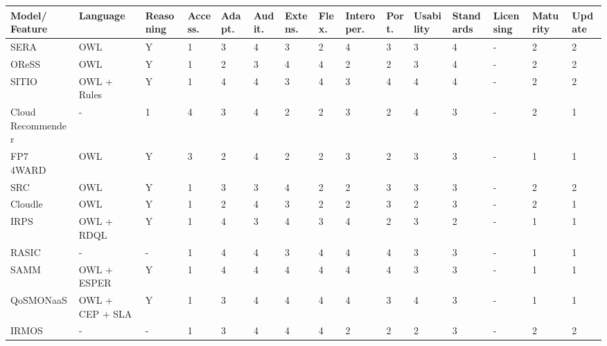 \begin{sidewaystable}[!ht]
\renewcommand{\arraystretch}{1.3}
\tiny
\begin{center}
\begin{tabular}[c]{|p{2.5cm}|p{1.2cm}|p{1.2cm}|p{1.2cm}|p{0.8cm}|p{0.8cm}|p{0.8cm}|p{0.8cm}|p{1.1cm}|p{1.1cm}|p{1.1cm}|p{1.1cm}|p{1.1cm}|p{1.1cm}|p{1.1cm}|} 
\hline
  \textbf{Model/ Feature} & \textbf{Language} & \textbf{Reasoning} & \textbf{Access.} & \textbf{Adapt.} & \textbf{Audit.} & \textbf{Extens.} & \textbf{Flex.} & \textbf{Interoper.} & \textbf{Port.} & \textbf{Usability} & \textbf{Standards} & \textbf{Licensing} & \textbf{Maturity} & \textbf{Update} \\ \hline
   SERA~\cite{Ejarque:2008:USR:1443230.1444322} & OWL & Y & 1 & 3 & 4 & 3 & 2 & 4 & 3 & 3 & 4 & - & 2 & 2 \\ \hline
   OReSS~\cite{2009gdc..conf..221Y} & OWL & Y & 1 & 2 & 3 & 4 & 4 & 2 & 2 & 3 & 4 & - & 2 & 2 \\ \hline
   SITIO~\cite{Garcia-Sanchez:2010:ASS:1852403.1852409} & OWL + Rules & Y & 1 & 4 & 4  & 3 & 4 & 3 & 4 & 4 & 4 & - & 2 & 2 \\ \hline
   Cloud Recommender~\cite{DBLP:conf/gecon/ZhangRNMH12} & - & 1 & 4 & 3 & 4 & 2 & 2 & 3 & 2 & 4 & 3 & - & 2 & 1 \\ \hline
   FP7 4WARD~\cite{5682131} & OWL & Y & 3 & 2 & 4 & 2 & 2 & 3 & 2& 3 & 3 & -& 1 & 1 \\ \hline
   SRC~\cite{DBLP:conf/soca/ChenL10} & OWL & Y & 1 & 3 & 3 & 4 & 2 & 2 &3 & 3  & 3 & - & 2 & 2 \\ \hline
   Cloudle~\cite{5682131} & OWL & Y & 1 & 2 & 4 & 3& 2& 2 & 3& 2& 3& -&2 &1 \\ \hline
   IRPS~\cite{6206823} & OWL + RDQL& Y & 1 & 4&3 &4 & 3& 4& 2& 3& 2& -&1&1 \\ \hline
   RASIC~\cite{Buyya:2010:IUF:2143583.2143586} &- & -& 1 & 4 & 4& 3& 4& 4& 4& 3& 3&-&1 &1 \\ \hline
   SAMM~\cite{fg-2266} & OWL + ESPER & Y & 1 & 4&4 &4 &4 &4 & 4& 3& 3&- & 1&1 \\ \hline
   QoSMONaaS~\cite{srt-15} & OWL + CEP + SLA& Y & 1&3 &4 &4 & 4& 4& 3& 4& 3& -& 1&1 \\ \hline
   IRMOS~\cite{DBLP:conf/compsac/CucinottaAA10}  & -&- &1 & 3& 4& 4& 4& 2& 2& 2& 3& -&2 &2 \\ \hline

\end{tabular}
\end{center}
\end{sidewaystable}
